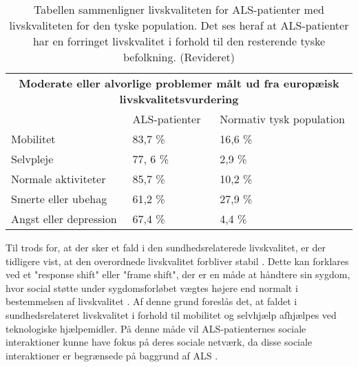 \begin{table}[H]
\centering
\begin{tabular}{l| l| l}
\multicolumn{3}{c}{\textbf{Moderate eller alvorlige problemer målt ud fra europæisk livskvalitetsvurdering}}
   \\
                                                                         & ALS-patienter                                    & Normativ tysk population                                   \\
Mobilitet                                                                & 83,7 \%                                          & 16,6 \%                                                    \\
Selvpleje                                                                & 77, 6 \%                                         & 2,9 \%                                                     \\
Normale aktiviteter                                                      & 85,7 \%                                          & 10,2 \%                                                    \\
Smerte eller ubehag                                                      & 61,2 \%                                          & 27,9 \%                                                    \\
Angst eller depression                                                   & 67,4 \%                                          & 4,4 \%                                                    \\
\end{tabular}
\label{tab:livskvalitet}
\caption{Tabellen sammenligner livskvaliteten for ALS-patienter med livskvaliteten for den tyske population. Det ses heraf at ALS-patienter har en forringet livskvalitet i forhold til den resterende tyske befolkning.\citep{ilse2015} (Revideret)}
\end{table}

\noindent
Til trods for, at der sker et fald i den sundhedsrelaterede livskvalitet, er der tidligere vist, at den overordnede livskvalitet forbliver stabil \citep{ilse2015, nuebert2004}. Dette kan forklares ved et "response shift" eller "frame shift", der er en måde at håndtere sin sygdom, hvor social støtte under sygdomsforløbet vægtes højere end normalt i bestemmelsen af livskvalitet \citep{ilse2015}. Af denne grund foreslås det, at faldet i sundhedsrelateret livskvalitet i forhold til mobilitet og selvhjælp afhjælpes ved teknologiske hjælpemidler. På denne måde vil ALS-patienternes sociale interaktioner kunne have fokus på deres sociale netværk, da disse sociale interaktioner er begrænsede på baggrund af ALS \citep{ilse2015,tramonti2012}.







